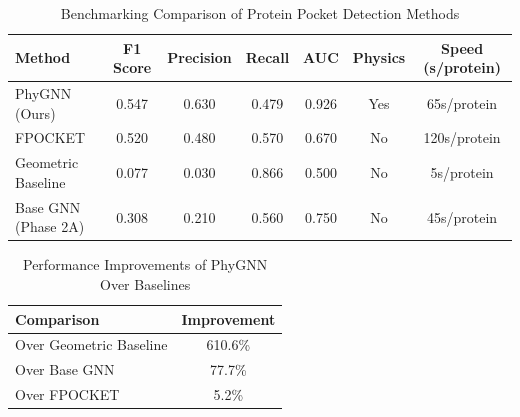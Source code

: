 \begin{table}[htbp]
\centering
\caption{Benchmarking Comparison of Protein Pocket Detection Methods}
\label{tab:benchmarking}
\begin{tabular}{lcccccc}
\hline
\textbf{Method} & \textbf{F1 Score} & \textbf{Precision} & \textbf{Recall} & \textbf{AUC} & \textbf{Physics} & \textbf{Speed (s/protein)} \\
\hline
PhyGNN (Ours) & 0.547 & 0.630 & 0.479 & 0.926 & Yes & 65s/protein \\
FPOCKET & 0.520 & 0.480 & 0.570 & 0.670 & No & 120s/protein \\
Geometric Baseline & 0.077 & 0.030 & 0.866 & 0.500 & No & 5s/protein \\
Base GNN (Phase 2A) & 0.308 & 0.210 & 0.560 & 0.750 & No & 45s/protein \\
\hline
\end{tabular}
\end{table}

\begin{table}[htbp]
\centering
\caption{Performance Improvements of PhyGNN Over Baselines}
\label{tab:improvements}
\begin{tabular}{lc}
\hline
\textbf{Comparison} & \textbf{Improvement} \\
\hline
Over Geometric Baseline & 610.6\% \\
Over Base GNN & 77.7\% \\
Over FPOCKET & 5.2\% \\
\hline
\end{tabular}
\end{table}